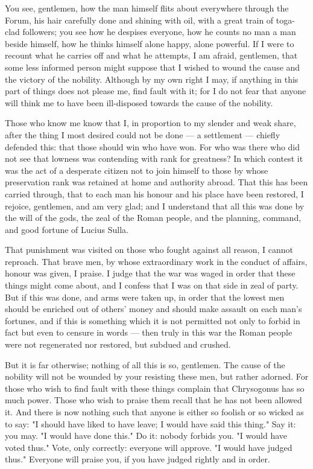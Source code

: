  You see, gentlemen, how the man himself flits about everywhere through the Forum, his hair carefully done and shining with oil, with a great train of toga-clad followers; you see how he despises everyone, how he counts no man a man beside himself, how he thinks himself alone happy, alone powerful. If I were to recount what he carries off and what he attempts, I am afraid, gentlemen, that some less informed person might suppose that I wished to wound the cause and the victory of the nobility. Although by my own right I may, if anything in this part of things does not please me, find fault with it; for I do not fear that anyone will think me to have been ill-disposed towards the cause of the nobility.

 Those who know me know that I, in proportion to my slender and weak share, after the thing I most desired could not be done --- a settlement --- chiefly defended this: that those should win who have won. For who was there who did not see that lowness was contending with rank for greatness? In which contest it was the act of a desperate citizen not to join himself to those by whose preservation rank was retained at home and authority abroad. That this has been carried through, that to each man his honour and his place have been restored, I rejoice, gentlemen, and am very glad; and I understand that all this was done by the will of the gods, the zeal of the Roman people, and the planning, command, and good fortune of Lucius Sulla.

 That punishment was visited on those who fought against all reason, I cannot reproach. That brave men, by whose extraordinary work in the conduct of affairs, honour was given, I praise. I judge that the war was waged in order that these things might come about, and I confess that I was on that side in zeal of party. But if this was done, and arms were taken up, in order that the lowest men should be enriched out of others' money and should make assault on each man's fortunes, and if this is something which it is not permitted not only to forbid in fact but even to censure in words --- then truly in this war the Roman people were not regenerated nor restored, but subdued and crushed.

 But it is far otherwise; nothing of all this is so, gentlemen. The cause of the nobility will not be wounded by your resisting these men, but rather adorned. For those who wish to find fault with these things complain that Chrysogonus has so much power. Those who wish to praise them recall that he has not been allowed it. And there is now nothing such that anyone is either so foolish or so wicked as to say: "I should have liked to have leave; I would have said this thing." Say it: you may. "I would have done this." Do it: nobody forbids you. "I would have voted thus." Vote, only correctly: everyone will approve. "I would have judged thus." Everyone will praise you, if you have judged rightly and in order.

